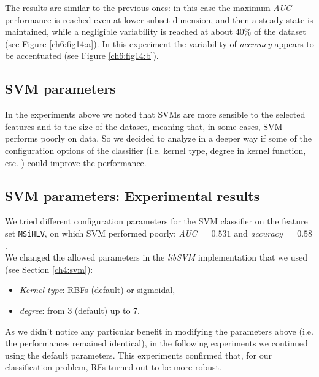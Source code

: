 The results are similar to the previous ones: in this case the maximum \textit{AUC} performance is reached even at lower subset dimension, and then a steady state 
is maintained, while a negligible variability is reached at about $40\%$ of the dataset (see Figure \ref{ch6:fig14:a}). In this experiment the variability of
\textit{accuracy} appears to be accentuated (see Figure \ref{ch6:fig14:b}).


\vspace{0.5cm}


\subsection{SVM parameters}

In the experiments above we noted that \Glspl{SVM} are more sensible to the selected features and to the size of the dataset, meaning that, in some cases, \Gls{SVM} performs poorly on data.
So we decided to analyze in a deeper way if some of the configuration options of the classifier (i.e. kernel type, degree in kernel function, etc. ) could improve the performance.


\vspace{0.5cm}

\subsection{SVM parameters: Experimental results}

We tried different configuration parameters for the \Gls{SVM} classifier on the feature set \texttt{MSiHLV}, on which \Gls{SVM} performed poorly: \textit{AUC} $=0.531$ and
\textit{accuracy} $=0.58$.\\
We changed the allowed parameters in the \textit{libSVM} implementation that we used (see Section \ref{ch4:svm}):

\begin{itemize}
 \item \textit{Kernel type}: \Glspl{RBF} (default) or sigmoidal,
 \item \textit{degree}: from 3 (default) up to 7.
\end{itemize}

As we didn't notice any particular benefit in modifying the parameters above (i.e. the performances remained identical), in the following experiments
we continued using the default parameters. This experiments confirmed that, for our classification problem, \Glspl{RF} turned out to be more robust.


